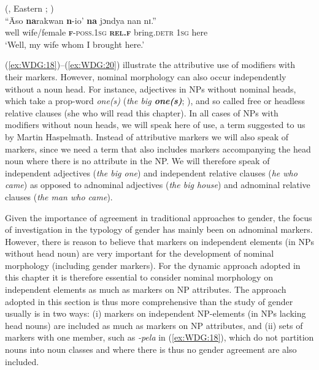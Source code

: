 \documentclass[output=collectionpaper]{langsci/langscibook}
\begin{document}
\ea\label{ex:WDG:20}
 (, Eastern ; \citealt[396]{Spagnolo1933})\\
\gll	``Āso	\textbf{na}rakwan	\textbf{n}-io'	\textbf{na}	jɔndya	nan	nɪ.''\\
well	wife/female	\textbf{\textsc{f}}-\textsc{poss.1sg}	\textbf{\textsc{rel.f}}	bring.\textsc{detr}	\textsc{1sg}	here\\
\glt `Well, my wife whom I brought here.'\\
\z

(\ref{ex:WDG:18})--(\ref{ex:WDG:20}) illustrate the attributive use of modifiers with their markers. However, nominal morphology can also occur independently without a noun head. For instance,  adjectives in NPs without nominal heads, which take a prop-word \textit{one(s)} (\textit{the big \textbf{one(s)}}; \citealt[245--271]{Jespersen1949}), and so called free or headless relative clauses (she who will read this chapter). In all cases of NPs with modifiers without noun heads, we will speak here of  use, a term suggested to us by Martin Haspelmath. Instead of attributive markers we will also speak of  markers, since we need a term that also includes markers accompanying the head noun where there is no attribute in the NP. We will therefore speak of independent adjectives (\textit{the big one}) and independent relative clauses (\textit{he who came}) as opposed to adnominal adjectives (\textit{the big house}) and adnominal relative clauses (\textit{the man who came}).

Given the importance of agreement in traditional approaches to gender, the focus of investigation in the typology of gender has mainly been on adnominal markers. However, there is reason to believe that markers on independent elements (in NPs without head noun) are very important for the development of nominal morphology (including gender markers). For the dynamic approach adopted in this chapter it is therefore essential to consider nominal morphology on independent elements as much as markers on NP attributes. The approach adopted in this section is thus more comprehensive than the study of gender usually is in two ways: (i) markers on independent NP-elements (in NPs lacking head nouns) are included as much as markers on NP attributes, and (ii) sets of markers with one member, such as  \textit{-pela} in (\ref{ex:WDG:18}), which do not partition nouns into noun classes and where there is thus no gender agreement are also included.
\end{document}
